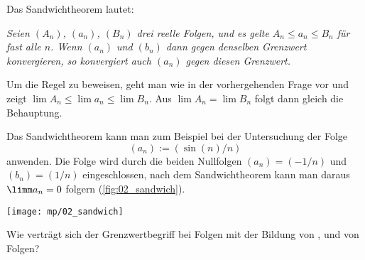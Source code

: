 \begin{antwort}
  Das Sandwichtheorem lautet:

  \medskip
  \noindent\textit{Seien 
    $(A_n)$, $(a_n)$, $(B_n)$ drei reelle Folgen, und es gelte 
    $A_n\le a_n\le B_n$ für fast alle $n$. 
    Wenn $(a_n)$ und $(b_n)$ dann gegen denselben Grenzwert konvergieren, 
    so konvergiert auch $(a_n)$ gegen diesen Grenzwert. } 

  Um die Regel zu beweisen, geht man wie in der vorhergehenden Frage vor 
  und zeigt $\lim A_n \le \lim a_n \le \lim B_n$. Aus $\lim A_n=\lim B_n$ 
  folgt dann gleich die Behauptung. 

  Das Sandwichtheorem kann man zum Beispiel bei der Untersuchung   
  der Folge 
  \[
  (a_n):=\left( \sin (n)/ n \right)
  \]
  anwenden. 
  Die Folge wird durch die beiden Nullfolgen 
  $(a_n)= (-1/n)$ und $(b_n)=(1/n)$ eingeschlossen, nach dem 
  Sandwichtheorem kann man daraus $\limm a_n = 0$ folgern (\sieheAbbildung\ref{fig:02_sandwich}).    
  \AntEnd 

  \begin{center}
    \texttt{[image: mp/02\_sandwich]}
    \label{fig:02_sandwich}
  \end{center}
\end{antwort}

\begin{frage}%
  \label{02_freg}
  Wie verträgt sich der Grenzwertbegriff bei Folgen mit der Bildung von 
  ,  und  von Folgen?
\end{frage}

